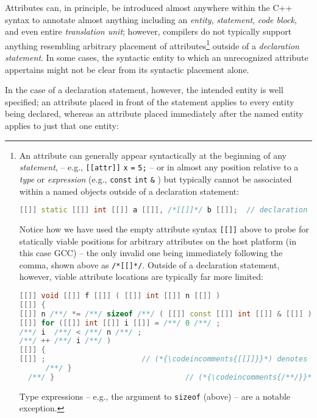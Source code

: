 \documentclass[twoside,10pt,letterpaper,usenames]{newstyle-PearsonGeneric-7-38}
\newcommand{\codeincomments}{\color{skyblue}\ttfamily}
\begin{document}
Attributes can, in principle, be introduced almost anywhere within the
C++ syntax to annotate almost anything including an \emph{entity},
\emph{statement}, \emph{code block}, and even entire \emph{translation
unit}; however, compilers do not typically support anything resembling
arbitrary placement of attributes{\cprotect\footnote{An attribute can
generally appear syntactically at the beginning of any
\emph{statement}, -- e.g., \texttt{[[attr]]} \texttt{x} \texttt{=}
\texttt{5;} -- or in almost any position relative to a \emph{type} or
\emph{expression} (e.g., \texttt{const} \texttt{int} \texttt{\&} ) but
typically cannot be associated within a named objects outside of a
declaration statement:

\begin{lstlisting}[language=C++, basicstyle={\ttfamily\footnotesize}]
[[]] static [[]] int [[]] a [[]], /*[[]]*/ b [[]];  // declaration statement
\end{lstlisting}


Notice how we have used the empty attribute syntax \texttt{[[]]} above
to probe for statically viable positions for arbitrary attributes on
the host platform (in this case GCC) -- the only invalid one being
immediately following the comma, shown above as \texttt{/*[[]*/}.
Outside of a declaration statement, however, viable attribute
locations are typically far more limited:

\begin{lstlisting}[language=C++, basicstyle={\ttfamily\footnotesize}]
[[]] void [[]] f [[]] ( [[]] int [[]] n [[]] )
[[]] {
[[]] n /**/ *= /**/ sizeof /**/ ( [[]] const [[]] int [[]] & [[]] ) /**/;
[[]] for ([[]] int [[]] i [[]] = /**/ 0 /**/ ;
/**/ i  /**/ < /**/ n /**/ ;
/**/ ++ /**/ i /**/ )
[[]] {
[[]] ;                      // (*{\codeincomments{[[]]}}*) denotes viable attribute location
      /**/ }
  /**/ }                              // (*{\codeincomments{/**/}}*) denotes no attribute is allowed
  \end{lstlisting}
      

  Type expressions -- e.g., the argument to \texttt{sizeof} (above) --
  are a notable exception.}} outside of a \emph{declaration statement}.
In some cases, the syntactic entity to which an unrecognized attribute
appertains might not be clear from its syntactic placement alone.

In the case of a declaration statement, however, the intended entity is
well specified; an attribute placed in front of the statement applies to
every entity being declared, whereas an attribute placed immediately
after the named entity applies to just that one entity:
\end{document}
